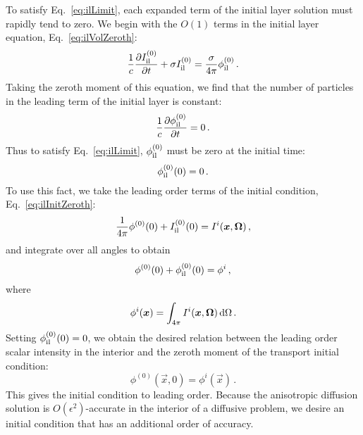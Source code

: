 To satisfy Eq.~\eqref{eq:ilLimit}, each
expanded term of the initial layer solution must rapidly
tend to zero. We begin with the $O(1)$ terms in the initial layer
equation, Eq.~\eqref{eq:ilVolZeroth}:
\begin{equation*}
  \frac{1}{c}\frac{\partial I_\mathrm{il}^{(0)}}{\partial t}
  + \sigma I_\mathrm{il}^{(0)}
  = \frac{\sigma}{4\pi} \phi_\mathrm{il}^{(0)} \,.
\end{equation*}
Taking the zeroth moment of this equation, we find that the number of particles
in the leading term of the initial layer is constant:
\begin{equation}\label{eq:ilVolZeroth2}
  \frac{1}{c}\frac{\partial \phi_\mathrm{il}^{(0)}}{\partial t} = 0 \,.
\end{equation}
Thus to satisfy Eq.~\eqref{eq:ilLimit}, $\phi_\mathrm{il}^{(0)}$ must be zero at the initial
time:
\begin{equation*}
  \phi_\mathrm{il}^{(0)}(0) = 0\,.
\end{equation*}
To use this fact, we take the leading order terms of the initial condition,
Eq.~\eqref{eq:ilInitZeroth}:
\begin{equation*}
 \frac{1}{4\pi} \phi^{(0)}(0) + I_\mathrm{il}^{(0)}(0) = I^i(\bm{x},\bm{\Omega})\,,
\end{equation*}
and integrate over all angles to obtain
\begin{equation*}
 \phi^{(0)}(0) + \phi_\mathrm{il}^{(0)}(0) = \phi^i\,,
\end{equation*}
where
\begin{equation*}
  \phi^i(\bm{x}) = \int_{4\pi} I^i(\bm{x},\bm{\Omega}) \mathop{}\!\mathrm{d}\Omega\,.
\end{equation*}
Setting $\phi_\mathrm{il}^{(0)}(0) = 0$, we obtain the desired relation between the leading order scalar
intensity in the interior and the zeroth moment of the transport initial
condition:
\begin{equation}\label{eq:ilZeroth}
  \phi^{(0)}(\vec{x}, 0) = \phi^i(\vec{x})\,.
\end{equation}
This gives the initial condition to leading order.
Because the anisotropic diffusion solution is $O(\epsilon^2)$-accurate in the
interior of a diffusive problem, we desire an initial condition that has an
additional order of accuracy.

